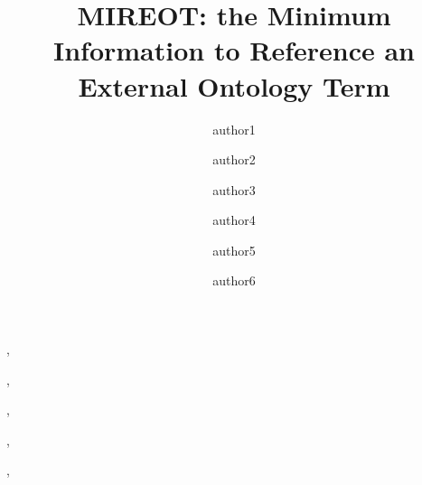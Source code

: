 \documentclass{elsart3p}    %
\begin{document}
\begin{frontmatter}

\title{\textbf{MIREOT: the Minimum Information to Reference an External Ontology Term}}




\author[institute1]{author1},
\author[institute2]{author2}, 
\author[institute3]{author3}, 
\author[institute4]{author4}, 
\author[institute5]{author5}, 
\author[institute6]{author6}




\medskip



\address[institute1]{xxxxxxxxxxxxxxxxxxxxxxxxxxxxxxxxxxxxxxxxxxxxxxxxxxxxxxxxxxxxxxxx}
\address[institute2]{xxxxxxxxxxxxxxxxxxxxxxxxxxxxxxxxxxxxxxxxxxxxxxxxxxxxxxxxxxxxxxxxxxxxxxxxxxxxxxxxx}
\address[institute3]{xxxxxxxxxxxxxxxxxxxxxxxxxxxxxxxxxxxxxxxxxxxxxxxxxxxxxxxxxxx}
\address[institute4]{xxxxxxxxxxxxxxxxxxxxxxxxxxxxxxxxxxxxxxxxxxxxxxxxxxxxxxxxxxxxxxxxxx}
\address[institute5]{xxxxxxxxxxxxxxxxxxxxxxxxxxxxxxxxxxxxxxxxx}
\address[institute6]{xxxxxxxxxxxxxxxxxxxxxxxxxxxxxxxxxxxxxxxxxxxxxxxxxxxxxxxxxxxxxxxxxxxxxxxxxxxxx}


\end{frontmatter}
\end{document}
